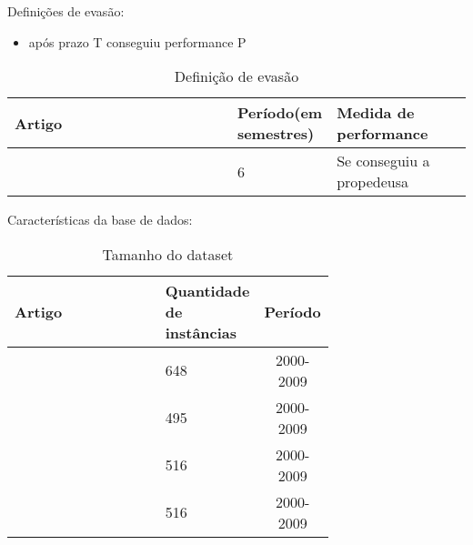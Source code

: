 



Definições de evasão:

\begin{itemize}
\item após prazo T conseguiu performance P
\end{itemize}

\begin{table}
\begin{tabular}{p{0.5\linewidth}m{0.2\linewidth}p{0.3\linewidth}}
\toprule
                            Artigo &  Período(em semestres) & Medida de performance\\
\midrule
  \cite{Predicting_Students} &  6 & Se conseguiu a propedeusa \\
\bottomrule
\end{tabular}
\caption{Definição de evasão}
\label{table:study_attributes_definicao}
\end{table}


Características da base de dados:

\begin{table}
\begin{tabular}{p{0.5\linewidth}p{0.2\linewidth}c}
\toprule
                            Artigo &  Quantidade de instâncias & Período\\
\midrule
  \cite{Predicting_Students} &  648 & 2000-2009\\
  &  495 & 2000-2009\\
  &  516 & 2000-2009\\
  &  516 & 2000-2009\\
\bottomrule
\end{tabular}
\caption{Tamanho do dataset}
\label{table:study_attributes_dataset}
\end{table}







